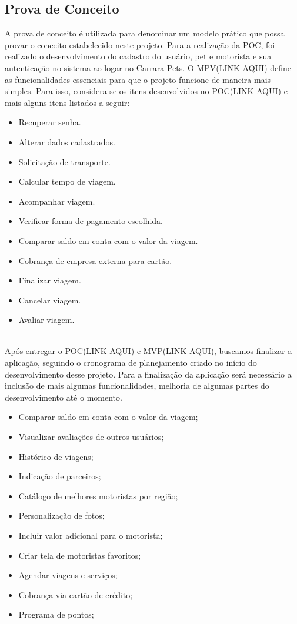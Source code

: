 \subsection{Prova de Conceito}
A prova de conceito é utilizada para denominar um modelo prático que possa provar o conceito estabelecido neste projeto. Para a realização da POC, foi realizado o desenvolvimento do cadastro do usuário, pet e motorista e sua autenticação no sistema ao logar no Carrara Pets. 
O MPV(LINK AQUI) define as funcionalidades essenciais para que o projeto funcione de maneira mais simples. Para isso, considera-se os itens desenvolvidos no POC(LINK AQUI) e mais alguns itens listados a seguir:
        \begin{itemize}
            \item Recuperar senha.
            \item Alterar dados cadastrados.
            \item Solicitação de transporte.
            \item Calcular tempo de viagem.
            \item Acompanhar viagem.
            \item Verificar forma de pagamento escolhida.
            \item Comparar saldo em conta com o valor da viagem.
            \item Cobrança de empresa externa para cartão.
            \item Finalizar viagem.
            \item Cancelar viagem.
            \item Avaliar viagem.
        \end{itemize}\\

Após entregar o POC(LINK AQUI) e MVP(LINK AQUI), buscamos finalizar a aplicação, seguindo o cronograma de planejamento criado no início do desenvolvimento desse projeto. Para a finalização da aplicação será necessário a inclusão de mais algumas funcionalidades, melhoria de algumas partes do desenvolvimento até o momento.
\begin{itemize}
    \item Comparar saldo em conta com o valor da viagem;
    \item Visualizar avaliações de outros usuários;
    \item Histórico de viagens;
    \item Indicação de parceiros;
    \item Catálogo de melhores motoristas por região;
    \item Personalização de fotos;
    \item Incluir valor adicional para o motorista;
    \item Criar tela de motoristas favoritos;
    \item Agendar viagens e serviços;
    \item Cobrança via cartão de crédito;
    \item Programa de pontos;
\end{itemize}\\
